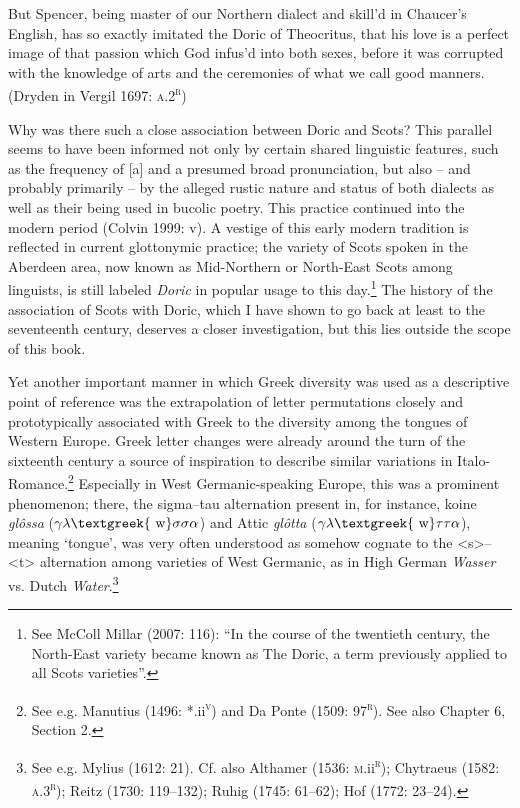\documentclass[12pt]{article}
\newenvironment{styleStandard}{\renewcommand\baselinestretch{1.25}\setlength\leftskip{0in}\setlength\rightskip{0in}\setlength\parindent{0.1972in}\setlength\parfillskip{0pt plus 1fil}\setlength\parskip{0in plus 1pt}\writerlistparindent\writerlistleftskip\leavevmode\normalfont\normalsize\writerlistlabel\ignorespaces}{\unskip\vspace{0in plus 1pt}\par}
\newenvironment{styleQuote}{\renewcommand\baselinestretch{1.25}\setlength\leftskip{0.3937in}\setlength\rightskip{0in}\setlength\parindent{0in}\setlength\parfillskip{0pt plus 1fil}\setlength\parskip{0.1665in plus 0.016649999in}\writerlistparindent\writerlistleftskip\leavevmode\normalfont\normalsize\writerlistlabel\ignorespaces}{\unskip\vspace{0.1665in plus 0.016649999in}\par}
\newcommand\writerlistleftskip{}
\newcommand\writerlistparindent{}
\newcommand\writerlistlabel{}
\begin{document}
\begin{styleQuote}
But Spencer, being master of our Northern dialect and skill’d in Chaucer’s English, has so exactly imitated the Doric of Theocritus, that his love is a perfect image of that passion which God infus’d into both sexes, before it was corrupted with the knowledge of arts and the ceremonies of what we call good manners. (Dryden in Vergil 1697: \textsc{a.2}\textsc{\textsuperscript{r}})
\end{styleQuote}

\begin{styleStandard}
Why was there such a close association between Doric and Scots? This parallel seems to have been informed not only by certain shared linguistic features, such as the frequency of [a] and a presumed broad pronunciation, but also – and probably primarily – by the alleged rustic nature and status of both dialects as well as their being used in bucolic poetry. This practice continued into the modern period (Colvin 1999: v). A vestige of this early modern tradition is reflected in current glottonymic practice; the variety of Scots spoken in the Aberdeen area, now known as Mid-Northern or North-East Scots among linguists, is still labeled \textit{Doric} in popular usage to this day.\footnote{ See McColl Millar (2007: 116): “In the course of the twentieth century, the North-East variety became known as The Doric, a term previously applied to all Scots varieties”.} The history of the association of Scots with Doric, which I have shown to go back at least to the seventeenth century, deserves a closer investigation, but this lies outside the scope of this book.
\end{styleStandard}

\begin{styleStandard}
Yet another important manner in which Greek diversity was used as a descriptive point of reference was the extrapolation of letter permutations closely and prototypically associated with Greek to the diversity among the tongues of Western Europe. Greek letter changes were already around the turn of the sixteenth century a source of inspiration to describe similar variations in Italo-Romance.\footnote{ See e.g. Manutius (1496: *.ii\textsc{\textsuperscript{v}}) and Da Ponte (1509: 97\textsc{\textsuperscript{r}}). See also Chapter 6, Section 2.} Especially in West Germanic-speaking Europe, this was a prominent phenomenon; there, the sigma–tau alternation present in, for instance, koine \textit{glôssa} ($\gamma \lambda \text{\textgreek{~w}}\sigma \sigma \alpha $) and Attic \textit{glôtta} ($\gamma \lambda \text{\textgreek{~w}}\tau \tau \alpha $), meaning ‘tongue’, was very often understood as somehow cognate to the {\textless}s{\textgreater}–{\textless}t{\textgreater} alternation among varieties of West Germanic, as in High German \textit{Wasser} vs. Dutch \textit{Water}.\footnote{ See e.g. Mylius (1612: 21). Cf. also Althamer (1536: \textsc{m}.ii\textsc{\textsuperscript{r}}); Chytraeus (1582: \textsc{a.3}\textsc{\textsuperscript{r}}); Reitz (1730: 119–132); Ruhig (1745: 61–62); Hof (1772: 23–24).}
\end{styleStandard}
\end{document}
